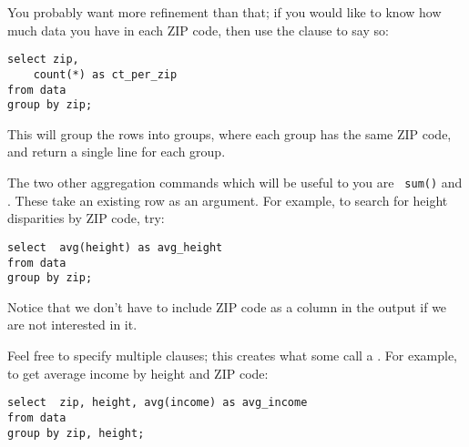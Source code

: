 \label{crosstabs}

You probably want more refinement than that; if you would like to
know how much data you have in each ZIP code, then use the  clause to say so:
\begin{lstlisting}
select zip, 
    count(*) as ct_per_zip
from data
group by zip;
\end{lstlisting}
This will group the rows into groups, where each group has the same ZIP
code, and return a single line for each group.


The two other aggregation commands which will be useful to you are {\tt
sum()} and . These take an existing row as an argument.
For example, to search for height disparities by ZIP code, try:
\begin{lstlisting}
select  avg(height) as avg_height
from data
group by zip;
\end{lstlisting}
Notice that we don't have to include ZIP code as a column in the output
if we are not interested in it.

Feel free to specify multiple  clauses; this creates what
some call a . For example, to get average income by
height and ZIP code: 
\begin{lstlisting}
select  zip, height, avg(income) as avg_income
from data
group by zip, height;
\end{lstlisting}

